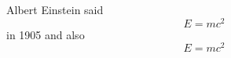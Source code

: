 \documentclass[preview]{standalone}
\begin{document}
\begin{center}
Albert Einstein said \[E=mc^2\] in 1905 and also \begin{equation}E=mc^2\end{equation}
\end{center}
\end{document}
